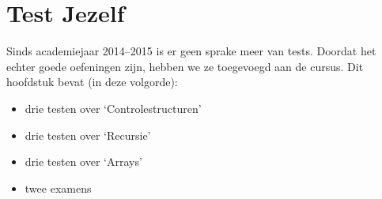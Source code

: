 \chapter{Test Jezelf}
Sinds academiejaar 2014--2015 is er geen sprake meer van tests. Doordat het echter goede oefeningen
zijn, hebben we ze toegevoegd aan de cursus.
Dit hoofdstuk bevat (in deze volgorde):

\begin{itemize}
\item drie testen over `Controlestructuren'
\item drie testen over `Recursie'
\item drie testen over `Arrays'
\item twee examens
\end{itemize}
















